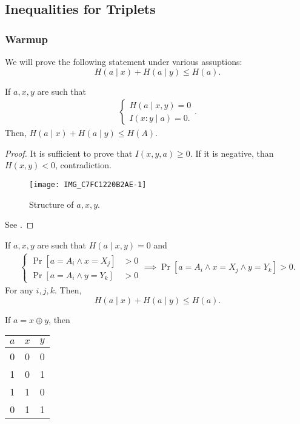 \subsection{Inequalities for Triplets}

\subsubsection{Warmup}

We will prove the following statement under various assuptions:
\[
H(a  \mid x) + H(a  \mid y) \le H(a)
.\] 

\begin{lemma} 
If $a, x, y$ are such that 
 \begin{align*}
	 \begin{cases}
	 	H(a  \mid x, y) = 0 \\
		I(x : y  \mid a) = 0.
	 \end{cases}
.\end{align*}
Then, $H(a  \mid  x) + H(a  \mid  y) \le  H(A)$.
\end{lemma}
\begin{proof}
	It is sufficient to prove that $I(x, y, a) \ge 0$.
	If it is negative, than $H(x, y) < 0$, contradiction.
	 \begin{figure}[htpb]
		\centering
		\texttt{[image: IMG\_C7FC1220B2AE-1]}
		\caption{Structure of $a, x, y$.}
		\label{fig:IMG_C7FC1220B2AE-1}
	\end{figure}
	See .
\end{proof}

\begin{theorem}
	If $a, x, y$ are such that $H(a \mid  x, y) = 0$ and
	 \begin{align*}
		\begin{cases}
			\Pr[a = A_i \land x = X_j] &> 0 \\
			\Pr[a = A_i \land y = Y_k] &> 0
		\end{cases} \implies \Pr[a = A_i \land x = X_j \land y = Y_k] > 0
	.\end{align*}
	For any $i, j, k$.
	Then,
	 \[
	H(a  \mid x) + H(a  \mid y) \le  H(a)
	.\] 
\end{theorem}
If $a = x \oplus y$, then

\begin{center}
\begin{tabular}{c|c|c}
	$a$ &  $x$ &  $y$ \\
	\hline
	0 & 0 & 0 \\
	1 & 0 & 1 \\
	1 & 1 & 0 \\
	0 & 1 & 1
\end{tabular}
\end{center}

